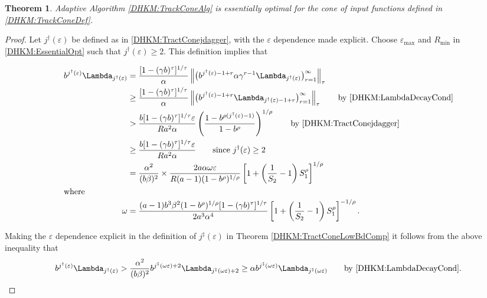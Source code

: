 \documentclass[USenglish]{article}
\theoremstyle{dgthm}
\newtheorem{theorem}{Theorem}
\theoremstyle{dgthm}
\theoremstyle{dgthm}
\theoremstyle{dgthm}
\theoremstyle{dgdef}
\theoremstyle{definition}
\newcommand{\norm}[2][{}]{\ensuremath{\left \lVert #2 \right \rVert}_{#1}}
\begin{document}
\begin{theorem}
\label{DHKM:TrackConeAlgOptThm}
Adaptive Algorithm \ref{DHKM:TrackConeAlg} is essentially optimal for the cone of input functions defined in \eqref{DHKM:TrackConeDef}.
\end{theorem}
\begin{proof}
Let $j^\dagger(\varepsilon)$ be defined as in \eqref{DHKM:TractConejdagger}, with the $\varepsilon$ dependence made explicit.  Choose $\varepsilon_{\max}$ and $R_{\min}$ in \eqref{DHKM:EssentialOpt} such that $j^\dagger(\varepsilon) \ge 2$.  This definition implies that

\begin{align*}
    b^{j^\dagger(\varepsilon)} \Lambda_{j^\dagger(\varepsilon) } 
   & = \frac{[1 - (\gamma b)^\tau]^{1/\tau}}{\alpha}
   \norm[\tau]{ \bigl(b^{j^\dagger(\varepsilon)-1+r} \alpha \gamma^{r-1} \Lambda_{j^\dagger(\varepsilon)} \bigr)_{r=1}^\infty}
    \\
    & \ge \frac{[1 - (\gamma b)^\tau]^{1/\tau}}{\alpha}  \norm[\tau]{ \bigl(b^{j^\dagger(\varepsilon)-1+r}\Lambda_{j^\dagger(\varepsilon)-1+r} \bigr)_{r=1}^\infty} \qquad \text{by \eqref{DHKM:LambdaDecayCond}} 
    \\
    &
    > \frac{b [1 - (\gamma b)^\tau]^{1/\tau} \varepsilon}{Ra^2 \alpha} \left( \frac{1 - b^{\rho(j^\dagger(\varepsilon)-1)}}{1 - b^\rho} \right)^{1/\rho} \qquad \text{by \eqref{DHKM:TractConejdagger}}
    \\
    &
    \ge \frac{b [1 - (\gamma b)^\tau]^{1/\tau} \varepsilon}{Ra^2 \alpha} \qquad \text{since } j^\dagger(\varepsilon) \ge 2
    \\
    & =   \frac{\alpha^2}{(b\beta)^2} \times \frac{2a \alpha \omega \varepsilon}{R(a-1)(1 - b^\rho)^{1/\rho}}  \left[1 + \left(\frac 1 {S_2} -1 \right) S_1^\rho \right]^{1/\rho}
    \\
    \intertext{where }
   \omega  & = \frac{(a-1)b^3 \beta^2 (1 - b^\rho)^{1/\rho} [1 - (\gamma b)^\tau]^{1/\tau}}{2a^3 \alpha^4 } \left[1 + \left(\frac 1 {S_2} -1 \right) S_1^\rho \right]^{-1/\rho}.
\end{align*}

Making the $\varepsilon$ dependence explicit in the definition of $j^\ddagger(\varepsilon)$ in Theorem \ref{DHKM:TractConeLowBdComp} it follows from the above inequality that
\begin{equation*}
    b^{j^\dagger(\varepsilon)} \Lambda_{j^\dagger(\varepsilon) } 
     > \frac{\alpha^2}{(b\beta)^2} b^{j^\ddagger(\omega\varepsilon)+2} \Lambda_{j^\ddagger(\omega \varepsilon) + 2 } 
    \ge \alpha b^{j^\ddagger(\omega\varepsilon)} \Lambda_{j^\ddagger(\omega \varepsilon)} \qquad \text{by \eqref{DHKM:LambdaDecayCond}}.
\end{equation*}



\end{proof}
\end{document}
